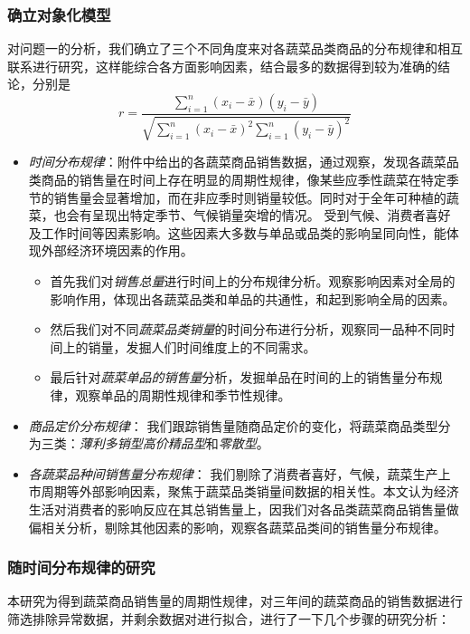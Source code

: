 \documentclass{article}
\begin{document}
\subsubsection{确立对象化模型}
对问题一的分析，我们确立了三个不同角度来对各蔬菜品类商品的分布规律和相互联系进行研究，这样能综合各方面影响因素，结合最多的数据得到较为准确的结论，分别是
\[
r = \frac{
    \sum_{i=1}^{n} (x_i - \bar{x})(y_i - \bar{y})
}{
    \sqrt{
        \sum_{i=1}^{n} (x_i - \bar{x})^2
        \sum_{i=1}^{n} (y_i - \bar{y})^2
    }
}
\]
\begin{itemize}
    \item \textit{时间分布规律}：附件中给出的各蔬菜商品销售数据，通过观察，发现各蔬菜品类商品的销售量在时间上存在明显的周期性规律，像某些应季性蔬菜在特定季节的销售量会显著增加，而在非应季时则销量较低。同时对于全年可种植的蔬菜，也会有呈现出特定季节、气候销量突增的情况。
    受到气候、消费者喜好及工作时间等因素影响。这些因素大多数与单品或品类的影响呈同向性，能体现外部经济环境因素的作用。

    \begin{itemize}
        \item 首先我们对\textit{销售总量}进行时间上的分布规律分析。观察影响因素对全局的影响作用，体现出各蔬菜品类和单品的共通性，和起到影响全局的因素。
        \item 然后我们对不同\textit{蔬菜品类销量}的时间分布进行分析，观察同一品种不同时间上的销量，发掘人们时间维度上的不同需求。
        \item 最后针对\textit{蔬菜单品的销售量}分析，发掘单品在时间的上的销售量分布规律，观察单品的周期性规律和季节性规律。
    \end{itemize}
    \item \textit{商品定价分布规律}：
    我们跟踪销售量随商品定价的变化，将蔬菜商品类型分为三类：\textit{薄利多销型}\textit{高价精品型}和\textit{零散型}。
    \item \textit{各蔬菜品种间销售量分布规律}：
    我们剔除了消费者喜好，气候，蔬菜生产上市周期等外部影响因素，聚焦于蔬菜品类销量间数据的相关性。本文认为经济生活对消费者的影响反应在其总销售量上，因我们对各品类蔬菜商品销售量做偏相关分析，剔除其他因素的影响，观察各蔬菜品类间的销售量分布规律。
\end{itemize}

\subsubsection{随时间分布规律的研究}
本研究为得到蔬菜商品销售量的周期性规律，对三年间的蔬菜商品的销售数据进行筛选排除异常数据，并剩余数据对进行拟合，进行了一下几个步骤的研究分析：
\end{document}
